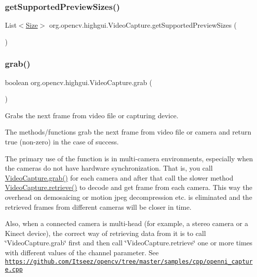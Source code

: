 \subsubsection{\texorpdfstring{get\+Supported\+Preview\+Sizes()}{getSupportedPreviewSizes()}}
{\footnotesize\ttfamily List$<$\mbox{\hyperlink{classorg_1_1opencv_1_1core_1_1_size}{Size}}$>$ org.\+opencv.\+highgui.\+Video\+Capture.\+get\+Supported\+Preview\+Sizes (\begin{DoxyParamCaption}{ }\end{DoxyParamCaption})}

\mbox{\label{classorg_1_1opencv_1_1highgui_1_1_video_capture_adfd842fc225468ef9ba91b148a551297}} 
\subsubsection{\texorpdfstring{grab()}{grab()}}
{\footnotesize\ttfamily boolean org.\+opencv.\+highgui.\+Video\+Capture.\+grab (\begin{DoxyParamCaption}{ }\end{DoxyParamCaption})}

Grabs the next frame from video file or capturing device.

The methods/functions grab the next frame from video file or camera and return true (non-\/zero) in the case of success.

The primary use of the function is in multi-\/camera environments, especially when the cameras do not have hardware synchronization. That is, you call {\ttfamily \mbox{\hyperlink{classorg_1_1opencv_1_1highgui_1_1_video_capture_adfd842fc225468ef9ba91b148a551297}{Video\+Capture.\+grab()}}} for each camera and after that call the slower method {\ttfamily \mbox{\hyperlink{classorg_1_1opencv_1_1highgui_1_1_video_capture_a222457b750c7be22da0f867e4759c631}{Video\+Capture.\+retrieve()}}} to decode and get frame from each camera. This way the overhead on demosaicing or motion jpeg decompression etc. is eliminated and the retrieved frames from different cameras will be closer in time.

Also, when a connected camera is multi-\/head (for example, a stereo camera or a Kinect device), the correct way of retrieving data from it is to call \char`\"{}\+Video\+Capture.\+grab\char`\"{} first and then call \char`\"{}\+Video\+Capture.\+retrieve\char`\"{} one or more times with different values of the {\ttfamily channel} parameter. See \href{https://github.com/Itseez/opencv/tree/master/samples/cpp/openni_capture.cpp}{\tt https\+://github.\+com/\+Itseez/opencv/tree/master/samples/cpp/openni\+\_\+capture.\+cpp}

